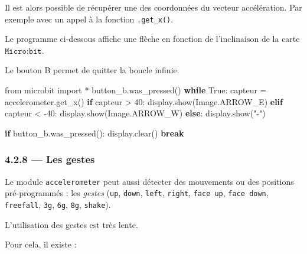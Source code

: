 \documentclass[a4paper,17pt]{extarticle}
\newenvironment{Shaded}{}{}
\newcommand{\DecValTok}[1]{\textcolor[rgb]{0.25,0.63,0.44}{{#1}}}
\newcommand{\StringTok}[1]{\textcolor[rgb]{0.25,0.44,0.63}{{#1}}}
\newcommand{\NormalTok}[1]{{#1}}
\newcommand{\ImportTok}[1]{{#1}}
\newcommand{\VariableTok}[1]{\textcolor[rgb]{0.10,0.09,0.49}{{#1}}}
\newcommand{\ControlFlowTok}[1]{\textcolor[rgb]{0.00,0.44,0.13}{\textbf{{#1}}}}
\newcommand{\OperatorTok}[1]{\textcolor[rgb]{0.40,0.40,0.40}{{#1}}}
\begin{document}
Il est alors possible de récupérer une des coordonnées du vecteur
accélération. Par exemple avec un appel à la fonction
\texttt{.get\_x()}.
\begin{exemple}
    Le programme ci-dessous affiche une flèche en fonction de l'inclinaison
de la carte \(\texttt{Micro:bit}\).

Le bouton B permet de quitter la boucle infinie.

\begin{Shaded}
\begin{Highlighting}[]
\ImportTok{from}\NormalTok{ microbit }\ImportTok{import} \OperatorTok{*}
\NormalTok{button\_b.was\_pressed()}
\ControlFlowTok{while} \VariableTok{True}\NormalTok{:}
\NormalTok{    capteur }\OperatorTok{=}\NormalTok{ accelerometer.get\_x()}
    \ControlFlowTok{if}\NormalTok{ capteur }\OperatorTok{\textgreater{}} \DecValTok{40}\NormalTok{:}
\NormalTok{        display.show(Image.ARROW\_E)}
    \ControlFlowTok{elif}\NormalTok{ capteur }\OperatorTok{\textless{}} \OperatorTok{{-}}\DecValTok{40}\NormalTok{:}
\NormalTok{        display.show(Image.ARROW\_W)}
    \ControlFlowTok{else}\NormalTok{:}
\NormalTok{        display.show(}\StringTok{"{-}"}\NormalTok{)}
        
    \ControlFlowTok{if}\NormalTok{ button\_b.was\_pressed():}
\NormalTok{        display.clear()}
        \ControlFlowTok{break}
\end{Highlighting}
\end{Shaded}

        \end{exemple}
    \hypertarget{les-gestes}{%
\subsubsection{4.2.8 --- Les gestes}\label{les-gestes}}

Le module \texttt{accelerometer} peut aussi détecter des mouvements ou
des positions pré-programmés : les \emph{gestes}
(\texttt{\textquotesingle{}up\textquotesingle{}},
\texttt{\textquotesingle{}down\textquotesingle{}},
\texttt{\textquotesingle{}left\textquotesingle{}},
\texttt{\textquotesingle{}right\textquotesingle{}},
\texttt{\textquotesingle{}face\ up\textquotesingle{}},
\texttt{\textquotesingle{}face\ down\textquotesingle{}},
\texttt{\textquotesingle{}freefall\textquotesingle{}},
\texttt{\textquotesingle{}3g\textquotesingle{}},
\texttt{\textquotesingle{}6g\textquotesingle{}},
\texttt{\textquotesingle{}8g\textquotesingle{}},
\texttt{\textquotesingle{}shake\textquotesingle{}}).
\begin{remarque}
    L'utilisation des gestes est très lente.

        \end{remarque}
    Pour cela, il existe :
\end{document}
